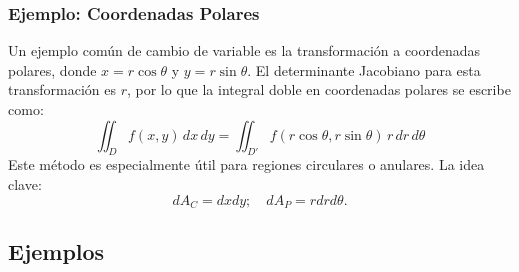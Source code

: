 \documentclass[11pt]{book}
\theoremstyle{definicion}
\theoremstyle{teorema}
\theoremstyle{ejemplo}
\begin{document}
\subsubsection{Ejemplo: Coordenadas Polares}

Un ejemplo común de cambio de variable es la transformación a coordenadas polares, donde \( x = r \cos \theta \) y \( y = r \sin \theta \). El determinante Jacobiano para esta transformación es \( r \), por lo que la integral doble en coordenadas polares se escribe como:
\[
\iint_D f(x, y) \, dx \, dy = \iint_{D'} f(r \cos \theta, r \sin \theta) \, r \, dr \, d\theta
\]
Este método es especialmente útil para regiones circulares o anulares. La idea clave:
\[
dA_C = dxdy; \quad dA_P = rdrd\theta . 
\]


\subsection{Ejemplos} 
\end{document}
